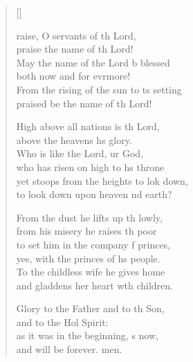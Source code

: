 \settowidth{\versewidth}{From the rising of the sun to its setting *}
\begin{verse}[\versewidth]
  \begin{patverse}
raise, O servants of th Lord,\Med\\
praise the name of th Lord!\\
May the name of the Lord b blessed\Med\\
both now and for evrmore!\\
From the rising of the sun to \pointup{\i}ts setting\Med\\
praised be the name of th Lord!

High above all nations is th Lord,\Med\\
above the heavens h\pointup{\i}s glory.\\
Who is like the Lord, ur God,\Med\\
who has risen on high to h\pointup{\i}s throne\\
yet stoops from the heights to lok down,\Med\\
to look down upon heaven nd earth?

From the dust he lifts up th lowly,\Med\\
from his misery he raises th poor\\
to set him in the company f princes,\Med\\
yes, with the princes of h\pointup{\i}s people.\\
To the childless wife he gives  home\Med\\
and gladdens her heart w\pointup{\i}th children.

Glory to the Father and to th Son,\Med\\
and to the Hol Spirit:\\
as it was in the beginning, \pointup{\i}s now,\Med\\
and will be forever. men.
  \end{patverse}
\end{verse}
